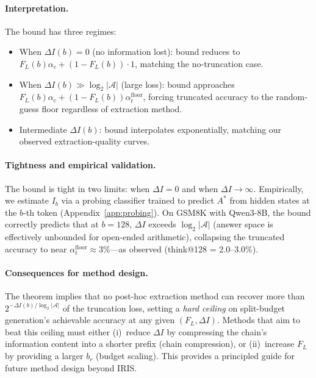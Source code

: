 \paragraph{Interpretation.}
The bound has three regimes:
\begin{itemize}[nosep,leftmargin=*]
  \item When $\Delta I(b) = 0$ (no information lost): bound reduces to
    $F_L(b)\alpha_c + (1-F_L(b)) \cdot 1$, matching the no-truncation
    case.
  \item When $\Delta I(b) \gg \log_2 |\mathcal{A}|$ (large loss): bound
    approaches $F_L(b)\alpha_c + (1-F_L(b)) \alpha_t^{\mathrm{floor}}$,
    forcing truncated accuracy to the random-guess floor regardless of
    extraction method.
  \item Intermediate $\Delta I(b)$: bound interpolates exponentially,
    matching our observed extraction-quality curves.
\end{itemize}

\paragraph{Tightness and empirical validation.}
The bound is tight in two limits: when $\Delta I = 0$ and when
$\Delta I \to \infty$.
Empirically, we estimate $I_b$ via a probing classifier trained to
predict $A^*$ from hidden states at the $b$-th token
(Appendix~\ref{app:probing}).
On GSM8K with Qwen3-8B, the bound correctly predicts that at $b{=}128$,
$\Delta I$ exceeds $\log_2 |\mathcal{A}|$ (answer space is effectively
unbounded for open-ended arithmetic), collapsing the truncated accuracy
to near $\alpha_t^{\mathrm{floor}} \approx 3\%$---as observed
(think@128 = 2.0--3.0\%).

\paragraph{Consequences for method design.}
The theorem implies that no post-hoc extraction method can recover
more than $2^{-\Delta I(b)/\log_2 |\mathcal{A}|}$ of the truncation
loss, setting a \emph{hard ceiling} on split-budget generation's
achievable accuracy at any given $(F_L, \Delta I)$.
Methods that aim to beat this ceiling must either (i)~reduce
$\Delta I$ by compressing the chain's information content into a
shorter prefix (chain compression), or (ii)~increase $F_L$ by
providing a larger $b_r$ (budget scaling).
This provides a principled guide for future method design beyond IRIS.
